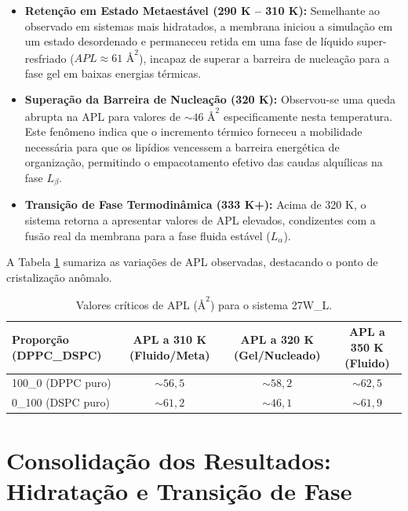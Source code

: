 \documentclass[12pt]{article} %
\begin{document}
\begin{itemize}
    \item \textbf{Retenção em Estado Metaestável (290 K -- 310 K):} Semelhante ao observado em sistemas mais hidratados, a membrana iniciou a simulação em um estado desordenado e permaneceu retida em uma fase de líquido super-resfriado ($APL \approx 61 \text{ \AA}^2$), incapaz de superar a barreira de nucleação para a fase gel em baixas energias térmicas.
    
    \item \textbf{Superação da Barreira de Nucleação (320 K):} Observou-se uma queda abrupta na APL para valores de $\sim 46 \text{ \AA}^2$ especificamente nesta temperatura. Este fenômeno indica que o incremento térmico forneceu a mobilidade necessária para que os lipídios vencessem a barreira energética de organização, permitindo o empacotamento efetivo das caudas alquílicas na fase $L_\beta$.
    
    \item \textbf{Transição de Fase Termodinâmica (333 K+):} Acima de 320 K, o sistema retorna a apresentar valores de APL elevados, condizentes com a fusão real da membrana para a fase fluida estável ($L_\alpha$).
\end{itemize}

A Tabela \ref{tab:dados_27w} sumariza as variações de APL observadas, destacando o ponto de cristalização anômalo.

\begin{table}[htbp]
    \centering
    \caption{Valores críticos de APL ($\text{\AA}^2$) para o sistema 27W\_L.}
    \label{tab:dados_27w}
    \begin{tabular}{@{}lccc@{}}
        \toprule
        Proporção (DPPC\_DSPC) & APL a 310 K (Fluido/Meta) & APL a 320 K (Gel/Nucleado) & APL a 350 K (Fluido) \\ \midrule
        100\_0 (DPPC puro)     & $\sim 56,5$               & $\sim 58,2$                & $\sim 62,5$          \\
        0\_100 (DSPC puro)     & $\sim 61,2$               & $\sim 46,1$                & $\sim 61,9$          \\ \bottomrule
    \end{tabular}
\end{table}
\section{Consolidação dos Resultados: Hidratação e Transição de Fase}
\end{document}
